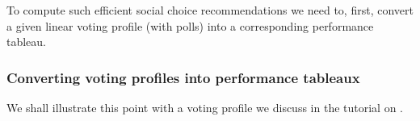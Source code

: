\documentclass[a4paper,12pt,english]{sphinxhowto}
\begin{document}
\sphinxAtStartPar
To compute such efficient social choice recommendations we need to, first, convert a given linear voting profile (with polls) into a corresponding performance tableau.


\subsubsection{Converting voting profiles into performance tableaux}
\label{\detokenize{pearls:converting-voting-profiles-into-performance-tableaux}}
\sphinxAtStartPar
We shall illustrate this point with a voting profile we discuss in the tutorial on .
\def\sphinxLiteralBlockLabel{\label{\detokenize{pearls:example3partiesvotingprofile}}}
%
\end{document}
